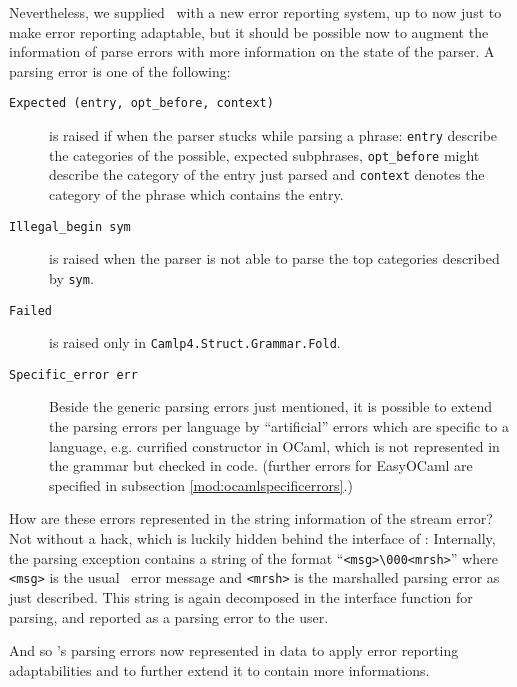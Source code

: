 Nevertheless, we supplied \camlpf\ with a new error reporting system, up 
to now just to make error reporting adaptable, but it should be possible 
now to augment the information of parse errors with more information on the
state of the parser. A parsing error is one of
the following:

\begin{description}
    \item[\texttt{Expected~(entry,~opt\_before,~context)}] is raised 
        if when the parser stucks while parsing a phrase: \texttt{entry} 
        describe the categories of the possible, expected subphrases, 
        \texttt{opt\_before} might describe the category of the entry 
        just parsed and \texttt{context} denotes the category of the 
        phrase which contains the entry.
    \item[\texttt{Illegal\_begin~sym}] is raised when the parser is 
        not able to parse the top categories described by \texttt{sym}.
    \item[\texttt{Failed}] is raised only in 
        \texttt{Camlp4.Struct.Grammar.Fold}.
    \item[\texttt{Specific\_error~err}] Beside the generic parsing 
        errors just mentioned, it is possible to extend the parsing 
        errors per language by ``artificial'' errors which are specific 
        to a language, e.g. currified constructor in OCaml, which is not
        represented in the grammar but checked in code.  (further errors for
        EasyOCaml are specified in subsection \ref{mod:ocamlspecificerrors}.)
\end{description}

How are these errors represented in the string information of the stream error?
Not without a hack, which is luckily hidden behind the interface of \camlpf:
Internally, the parsing exception contains a string of the format
``\texttt{<msg>\textbackslash 000<mrsh>}'' where \texttt{<msg>} is
the usual \camlpf\ error message and \texttt{<mrsh>} is the marshalled parsing
error as just described.
This string is again decomposed in the interface function for
parsing, and reported as
a parsing error to the user.

And so \camlpf's parsing errors now represented in data to apply error
reporting adaptabilities and to further extend it to contain more informations.


